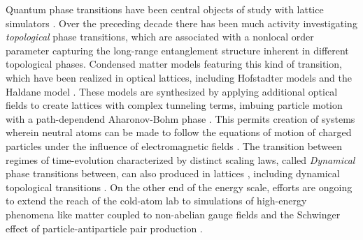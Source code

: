 	Quantum phase transitions have been central objects of study with lattice simulators \cite{Greiner01,Eckardt05,Jordens08,Baumann10,Endres12,Haller10,Leonard17,Landig16,SachdevQPT}.
	Over the preceding decade there has been much activity investigating \emph{topological} phase transitions, which are associated with a nonlocal order parameter capturing the long-range entanglement structure inherent in different topological phases\cite{Goldman16,Nakagawa14}.
	Condensed matter models featuring this kind of transition, which have been realized in optical lattices, including Hofstadter models\cite{Aidelsburger13,Tai17,Miyake13} and the Haldane model \cite{Jotzu14}.
	These models are synthesized by applying additional optical fields to create lattices with complex tunneling terms, imbuing particle motion with a path-dependend Aharonov-Bohm phase \cite{Aidelsburger11,Aidelsburger13,Miyake13}.
	This permits creation of systems wherein neutral atoms can be made to follow the equations of motion of charged particles under the influence of electromagnetic fields \cite{Aidelsburger13,Tai17,Endres11,Rispoli19,Jo09,Simon11,Miyake13,Folling07,Jotzu14}.
	The transition between regimes of time-evolution characterized by distinct scaling laws, called \emph{Dynamical} phase transitions between, can also produced in lattices \cite{Clark16}, including dynamical topological transitions \cite{Nakagawa14}.
	On the other end of the energy scale, efforts are ongoing to extend the reach of the cold-atom lab to simulations of high-energy phenomena like matter coupled to non-abelian gauge fields \cite{Zohar16,Schweizer19,Tagliacozzo13} and the Schwinger effect of particle-antiparticle pair production \cite{Pineiro19}.	
	

